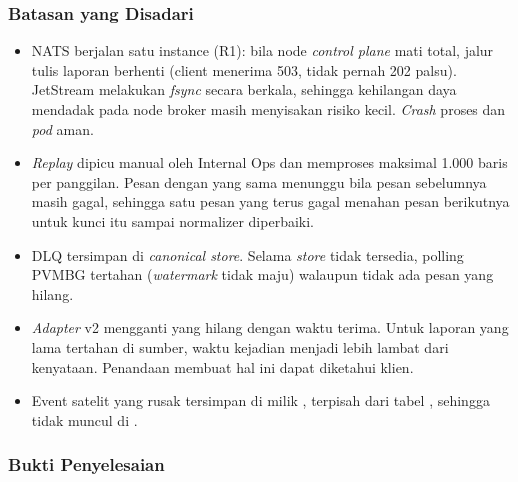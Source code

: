 \subsubsection{Batasan yang Disadari}
\begin{itemize}
\item NATS berjalan satu instance (R1): bila node \textit{control plane} mati total, jalur tulis laporan berhenti (client menerima 503, tidak pernah 202 palsu). JetStream melakukan \textit{fsync} secara berkala, sehingga kehilangan daya mendadak pada node broker masih menyisakan risiko kecil. \textit{Crash} proses dan \textit{pod} aman.
\item \textit{Replay} dipicu manual oleh Internal Ops dan memproses maksimal 1.000 baris per panggilan. Pesan dengan  yang sama menunggu bila pesan sebelumnya masih gagal, sehingga satu pesan yang terus gagal menahan pesan berikutnya untuk kunci itu sampai normalizer diperbaiki.
\item DLQ tersimpan di \textit{canonical store}. Selama \textit{store} tidak tersedia, polling PVMBG tertahan (\textit{watermark} tidak maju) walaupun tidak ada pesan yang hilang.
\item \textit{Adapter} v2 mengganti  yang hilang dengan waktu terima. Untuk laporan yang lama tertahan di sumber, waktu kejadian menjadi lebih lambat dari kenyataan. Penandaan  membuat hal ini dapat diketahui klien.
\item Event satelit yang rusak tersimpan di  milik , terpisah dari tabel , sehingga tidak muncul di .
\end{itemize}

\subsubsection{Bukti Penyelesaian}

